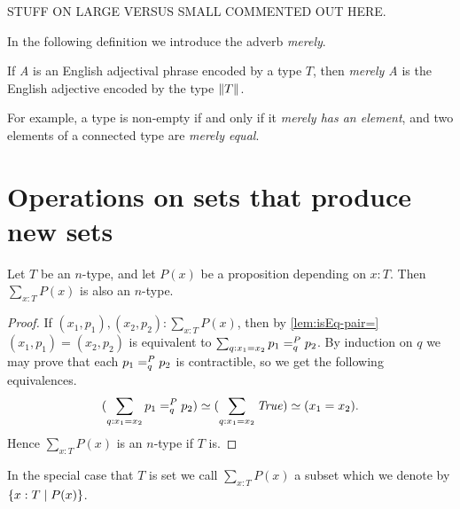 STUFF ON LARGE VERSUS SMALL COMMENTED OUT HERE.

In the following definition we introduce the adverb {\em merely}.

\begin{definition}\label{def:merely}
  If {\em A} is an English adjectival phrase encoded by a type $T$, 
then {\em merely A} is the English adjective encoded by the type $\lVert T\rVert$.
\end{definition}

For example, a type is non-empty if and only if it {\em merely has an element}, and two elements of a connected type are {\em merely equal}.

\section{Operations on sets that produce new sets}
\label{sec:operations-on-sets}

\begin{lemma}\label{lem:subtype}
Let $T$ be an $n$-type, and let $P(x)$ be a proposition depending on $x:T$. 
Then $\sum_{x:T} P(x)$ is also an $n$-type.
\end{lemma}

\begin{proof}
If $(x_1,p_1),(x_2,p_2) : \sum_{x:T} P(x)$, then by \cref{lem:isEq-pair=}
$(x_1,p_1)=(x_2,p_2)$ is equivalent to 
$\sum_{q:x_1=x_2} p_1 =^{P}_{q} p_2$.
By induction on $q$ we may prove that each $p_1 =^{P}_{q} p_2$ is contractible,
so we get the following equivalences.
\[
(\sum_{q:x_1=x_2} p_1 =^{P}_{q} p_2) \simeq 
(\sum_{q:x_1=x_2} \mathop{\mathit{True}}) \simeq (x_1=x_2).
\]
Hence $\sum_{x:T} P(x)$ is an $n$-type if $T$ is.
\end{proof}
In the special case that $T$ is set we call 
$\sum_{x:T} P(x)$ a subset which we denote by 
$\{x:T \mid P(x)\}$.

